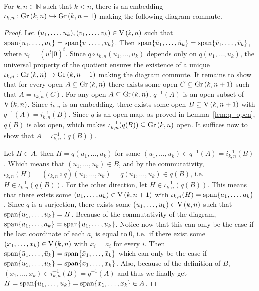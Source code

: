 \begin{proposition}\label{prop:gr_embedding} For $k,n\in\mathbb{N}$ such that $k<n$, there is an embedding $\iota_{k,n}:\Gr{k}{n}\hookrightarrow\Gr{k}{n+1}$ making the following diagram commute.
\begin{center}
\end{center}
\end{proposition}
\begin{proof} Let $(u_1,\ldots,u_k),(v_1,\ldots,v_k)\in\St{k}{n}$ such that $\mathrm{span}\{u_1,\ldots,u_k\}=\mathrm{span}\{v_1,\ldots,v_k\}$. Then $\mathrm{span}\{\bar{u}_1,\ldots,\bar{u}_k\}=\mathrm{span}\{\bar{v}_1,\ldots,\bar{v}_k\}$, where $\bar{u}_i=(u^t|0)^t$. Since $q\circ i_{k,n}(u_1,\ldots,u_k)$ depends only on $q(u_1,\ldots,u_k)$, the universal property of the quotient ensures the existence of a unique $\iota_{k,n}:\Gr{k}{n}\to\Gr{k}{n+1}$ making the diagram commute. It remains to show that for every open $A\subseteq\Gr{k}{n}$ there exists some open $C\subseteq\Gr{k}{n+1}$ such that $A=\iota_{k,n}^{-1}(C)$. For any open $A\subseteq\Gr{k}{n}$, $q^{-1}(A)$ is an open subset of $\St{k}{n}$. Since $i_{k,n}$ is an embedding, there exists some open $B\subseteq\St{k}{n+1}$ with $q^{-1}(A)=i_{k,n}^{-1}(B)$. Since $q$ is an open map, as proved in Lemma~\ref{lem:q_open}, $q(B)$ is also open, which makes $\iota_{k,n}^{-1}(q(B))\subseteq\Gr{k}{n}$ open. It suffices now to show that $A=\iota_{k,n}^{-1}(q(B))$.

Let $H\in A$, then $H=q(u_1,\ldots,u_k)$ for some $(u_1,\ldots,u_k)\in q^{-1}(A)=i_{k,n}^{-1}(B)$. Which means that $(\bar{u}_1,\ldots,\bar{u}_k)\in B$, and by the commutativity, $\iota_{k,n}(H)=(\iota_{k,n}\circ q)(u_1,\ldots,u_k)=q(\bar{u}_1,\ldots,\bar{u}_k)\in q(B)$, i.e.\ $H\in\iota_{k,n}^{-1}(q(B))$. For the other direction, let $H\in\iota_{k,n}^{-1}(q(B))$. This means that there exists some $(a_1,\ldots,a_k)\in\St{k}{n+1}$ with $\iota_{k,n}(H)=\mathrm{span}\{a_1,\ldots,a_k\}$. Since $q$ is a surjection, there exists some $(u_1,\ldots,u_k)\in\St{k}{n}$ such that $\mathrm{span}\{u_1,\ldots,u_k\}=H$. Because of the commutativity of the diagram, $\mathrm{span}\{a_1,\ldots,a_k\}=\mathrm{span}\{\bar{u}_1,\ldots,\bar{u}_k\}$. Notice now that this can only be the case if the last coordinate of each $a_i$ is equal to $0$, i.e.\ if there exist some $(x_1,\ldots,x_k)\in\St{k}{n}$ with $\bar{x}_i=a_i$ for every $i$. Then $\mathrm{span}\{\bar{u}_1,\ldots,\bar{u}_k\}=\mathrm{span}\{\bar{x}_1,\ldots,\bar{x}_k\}$ which can only be the case if $\mathrm{span}\{u_1,\ldots,u_k\}=\mathrm{span}\{x_1,\ldots,x_k\}$. Also, because of the definition of $B$, $(x_1,\ldots,x_k)\in i_{k,n}^{-1}(B)=q^{-1}(A)$ and thus we finally get $H=\mathrm{span}\{u_1,\ldots,u_k\}=\mathrm{span}\{x_1,\ldots,x_k\}\in A$.
\end{proof}
